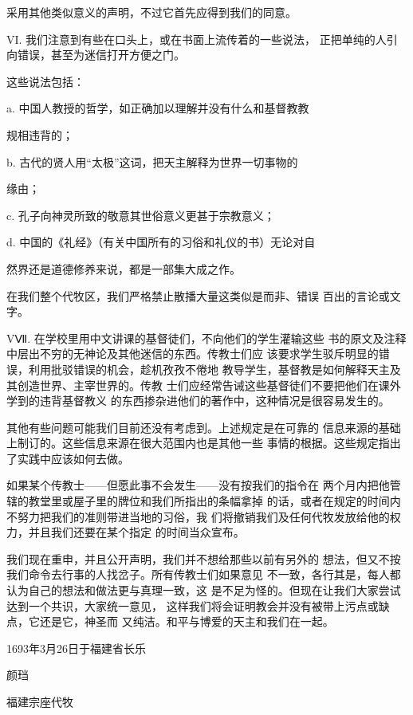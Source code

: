 {\bookkai 采用其他类似意义的声明，不过它首先应得到我们的同意。}%
\par
{\bookkai VI. 我们注意到有些在口头上，或在书面上流传着的一些说法，}%
{\bookkai 正把单纯的人引向错误，甚至为迷信打开方便之门。}%
\par
{\bookkai 这些说法包括：}%
\par
{\bookkai a. 中国人教授的哲学，如正确加以理解并没有什么和基督教教}%
\par
{\bookkai 规相违背的；}%
\par
{\bookkai b. 古代的贤人用“太极”这词，把天主解释为世界一切事物的}%
\par
{\bookkai 缘由；}%
\par
{\bookkai c. 孔子向神灵所致的敬意其世俗意义更甚于宗教意义；}%
\par
{\bookkai d. 中国的《礼经》（有关中国所有的习俗和礼仪的书）无论对自}%
\par
{\bookkai 然界还是道德修养来说，都是一部集大成之作。}%
\par
{\bookkai 在我们整个代牧区，我们严格禁止散播大量这类似是而非、错误}%
{\bookkai 百出的言论或文字。}%
\par
{\bookkai VⅦ. 在学校里用中文讲课的基督徒们，不向他们的学生灌输这些}%
{\bookkai 书的原文及注释中层出不穷的无神论及其他迷信的东西。传教士们应}%
{\bookkai 该要求学生驳斥明显的错误，利用批驳错误的机会，趁机孜孜不倦地}%
{\bookkai 教导学生，基督教是如何解释天主及其创造世界、主宰世界的。传教}%
{\bookkai 士们应经常告诫这些基督徒们不要把他们在课外学到的违背基督教义}%
{\bookkai 的东西掺杂进他们的著作中，这种情况是很容易发生的。}%
\par
{\bookkai 其他有些问题可能我们目前还没有考虑到。上述规定是在可靠的}%
{\bookkai 信息来源的基础上制订的。这些信息来源在很大范围内也是其他一些}%
{\bookkai 事情的根据。这些规定指出了实践中应该如何去做。}%
\par
{\bookkai 如果某个传教士——但愿此事不会发生——没有按我们的指令在}%
{\bookkai 两个月内把他管辖的教堂里或屋子里的牌位和我们所指出的条幅拿掉}%
{\bookkai 的话，或者在规定的时间内不努力把我们的准则带进当地的习俗，我}%
{\bookkai 们将撤销我们及任何代牧发放给他的权力，并且我们还要在某个指定}%
{\bookkai 的时间当众宣布。}%
\par
{\bookkai 我们现在重申，并且公开声明，我们并不想给那些以前有另外的}%
{\bookkai 想法，但又不按我们命令去行事的人找岔子。所有传教士们如果意见}%
{\bookkai 不一致，各行其是，每人都认为自己的想法和做法更与真理一致，这}%
{\bookkai 是不足为怪的。但现在让我们大家尝试达到一个共识，大家统一意见，}%
{\bookkai 这样我们将会证明教会并没有被带上污点或缺点，它还是它，神圣而}%
{\bookkai 又纯洁。和平与博爱的天主和我们在一起。}%
\par
{\bookkai 1693年3月26日于福建省长乐}%
\par
{\bookkai 颜珰}%
\par
{\bookkai 福建宗座代牧}%
